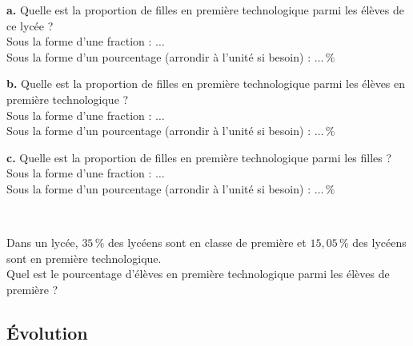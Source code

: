 {\begin{Exercice}
\begin{minipage}[t]{\linewidth}
\medskip
\textbf {a.}   Quelle est la proportion de filles en première technologique parmi les élèves de ce lycée ?\\Sous la forme d'une fraction : $\ldots$\\Sous la forme d'un pourcentage (arrondir à l'unité si besoin) : $\ldots\,\%$

\medskip
\textbf {b.}  Quelle est la proportion de filles en première technologique parmi les élèves en première technologique ?\\Sous la forme d'une fraction : $\ldots$\\Sous la forme d'un pourcentage (arrondir à l'unité si besoin) : $\ldots\,\%$

\medskip
\textbf {c.}   Quelle est la proportion de filles en première technologique parmi les filles ?\\Sous la forme d'une fraction : $\ldots$\\Sous la forme d'un pourcentage (arrondir à l'unité si besoin) : $\ldots\,\%$\end{minipage}\\

\end{Exercice}

\begin{Exercice} %
Dans un lycée,  $35\,\%$ des lycéens sont en classe de première et  $15{,}05\,\%$ des lycéens sont en première technologique.\\
              Quel est le pourcentage d'élèves en première technologique parmi les élèves de première ?\\

\end{Exercice}

\subsection*{Évolution}


}
